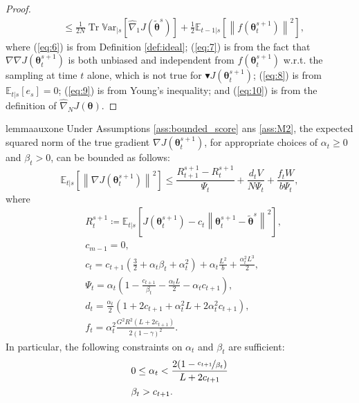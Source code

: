 \documentclass{article}
\makeatletter
\theoremstyle{remark}
\theoremstyle{definition}
\DeclareRobustCommand{\wrt}{w.r.t.\@\xspace}
\DeclareMathOperator{\Tr}{Tr}
\newcommand{\norm}[2][\infty]{\left\|#2\right\|_{#1}}
\newcommand{\dnabla}{\nabla\!\!\!\!\nabla}
\newcommand{\vtheta}{\boldsymbol{\theta}}
\newcommand{\gradJ}[1]{\nabla J(#1)}
\newcommand{\gradApp}[2]{\widehat{\nabla}_{#2}J(#1)}
\newcommand{\Ets}[2][t]{\mathbb{E}_{#1\vert s}\left[#2\right]}
\newcommand{\Varts}[2][t]{{\mathbb{V}\text{ar}}_{#1\vert s}\left[#2\right]}
\newcommand{\gradBlack}[1]{\blacktriangledown J(#1)}
\newcommand{\gradIdeal}[1]{\dnabla J(#1)}
\makeatother
\begin{document}
\begin{proof}
\begin{align}
	&\leq
	\frac{1}{2N}\Tr\Varts[]{\gradApp{\tilde{\vtheta}^s}{1}} +\frac{1}{2}\Ets[t-1]{\norm[]{f(\vtheta_t^{s+1})}^2},
	\nonumber
\end{align}
where (\ref{eq:6}) is from Definition \ref{def:ideal}; (\ref{eq:7}) is from the fact that $\gradIdeal{\vtheta_t^{s+1}}$ is both unbiased and independent from $f(\vtheta_t^{s+1})$ \wrt the sampling at time $t$ alone, which is not true for $\gradBlack{\vtheta_t^{s+1}}$; (\ref{eq:8}) is from $\Ets{e_s}=0$; (\ref{eq:9}) is from Young's inequality; and (\ref{eq:10}) is from the definition of $\gradApp{\vtheta}{N}$.
\end{proof}

\begin{restatable}[]{lemma}{auxone}\label{lemma:aux1}
Under Assumptions \ref{ass:bounded_score} ans \ref{ass:M2}, the expected squared norm of the true gradient $\gradJ{\vtheta_t^{s+1}}$, for appropriate choices of $\alpha_t\geq0$ and $\beta_t>0$, can be bounded as follows:
\[
	\Ets{\norm[]{\gradJ{\vtheta_t^{s+1}}}^2} \leq
	\frac{R_{t+1}^{s+1} - R_t^{s+1}}{\Psi_t} + \frac{d_tV}{N\Psi_t}
	+\frac{f_tW}{b\Psi_t},
\]
	where
\begin{align*}
	&R_t^{s+1}\coloneqq \Ets{J(\vtheta_t^{s+1}) - c_t\norm[]{\vtheta_t^{s+1}-\tilde{\vtheta}^s}^2}, \\
	&c_{m-1} = 0, \\
	&c_t = c_{t+1}\left(\frac{3}{2}+\alpha_t\beta_t+\alpha_t^2\right) + \alpha_t\frac{L^2}{b}+\frac{\alpha_t^2L^3}{2}, \\
	&\Psi_t = \alpha_t\left(1-\frac{c_{t+1}}{\beta_t}-\frac{\alpha_tL}{2}-\alpha_tc_{t+1}\right), \\
	&d_t = \frac{\alpha_t}{2}\left(1+2c_{t+1}+\alpha_t^2L+2\alpha_t^2c_{t+1}\right), \\
	&f_t = \alpha_t^2\frac{G^2R^2(L+2c_{t+1})}{2(1-\gamma)^2}.
\end{align*}
In particular, the following constraints on $\alpha_t$ and $\beta_t$ are sufficient:
\begin{align*}
&0\leq\alpha_t < \frac{2(1-\nicefrac{c_{t+1}}{\beta_t})}{L+2c_{t+1}} \\
&\beta_t > c_{t+1}.
\end{align*}
\end{restatable}
\end{document}
